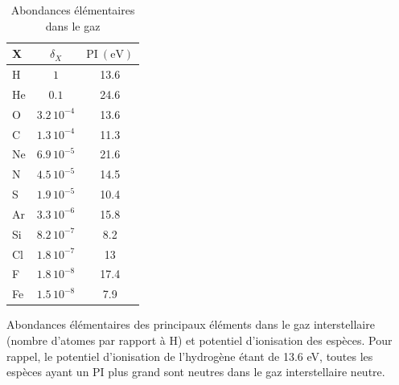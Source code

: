 \begin{table}[!h]
    \centering
    \begin{tabular}{|l|c|c|}
    \hline
     X & $\delta_X$ & $\mathrm{PI}\ (\mathrm{eV})$   \\
     \hline
     H    &  $1$          &     13.6   \\
     He   &  $0.1$        &    24.6      \\
     O    &  $3.2\,10^{-4}$ &    13.6    \\
     C    &  $1.3\,10^{-4}$ &    11.3    \\
     Ne   &  $6.9\,10^{-5}$ &    21.6    \\
     N    &  $4.5\,10^{-5}$ &    14.5    \\
     S    &  $1.9\,10^{-5}$ &    10.4    \\
     Ar   &  $3.3\,10^{-6}$ &    15.8    \\
     Si   &  $8.2\,10^{-7}$ &    8.2    \\
     \color{red}Cl  &  \color{red}$1.8\,10^{-7}$ &    \color{red}13    \\
     F    &  $1.8\,10^{-8}$ &    17.4    \\
     Fe   &  $1.5\,10^{-8}$ &    7.9    \\
     \hline
    \end{tabular}
    \caption{Abondances élémentaires dans le gaz}
    \begin{minipage}{\textwidth}
    Abondances élémentaires des principaux éléments dans le gaz interstellaire (nombre d'atomes par rapport à H) et potentiel d'ionisation des espèces. Pour rappel, le potentiel d'ionisation de l'hydrogène étant de 13.6 eV, toutes les espèces ayant un PI plus grand sont neutres dans le gaz interstellaire neutre. 
    \end{minipage}
    \label{tab:gaz}
\end{table}{}

